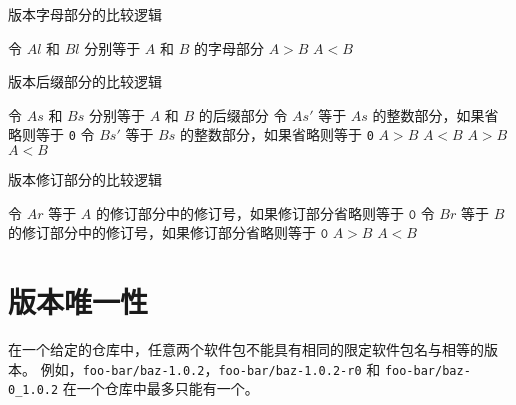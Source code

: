 \begin{algorithm}[p]
\caption{版本字母部分的比较逻辑} \label{alg:version-comparison-letter}
\begin{algorithmic}[1]
    \STATE 令 $Al$ 和 $Bl$ 分别等于 $A$ 和 $B$ 的字母部分
        \RETURN $A>B$
        \RETURN $A<B$
    \ENDIF
\end{algorithmic}
\end{algorithm}

\begin{algorithm}[t]
\caption{版本后缀部分的比较逻辑} \label{alg:version-comparison-suffix}
\begin{algorithmic}[1]
    \STATE 令 $As$ 和 $Bs$ 分别等于 $A$ 和 $B$ 的后缀部分
        \STATE 令 $As'$ 等于 $As$ 的整数部分，如果省略则等于 \texttt{0}
        \STATE 令 $Bs'$ 等于 $Bs$ 的整数部分，如果省略则等于 \texttt{0}
            \RETURN $A>B$
            \RETURN $A<B$
        \ENDIF
        \RETURN $A>B$
    \ELSE
        \RETURN $A<B$
    \ENDIF
\end{algorithmic}
\end{algorithm}

\begin{algorithm}[t]
\caption{版本修订部分的比较逻辑} \label{alg:version-comparison-revision}
\begin{algorithmic}[1]
    \STATE 令 $Ar$ 等于 $A$ 的修订部分中的修订号，如果修订部分省略则等于 $\texttt{0}$
    \STATE 令 $Br$ 等于 $B$ 的修订部分中的修订号，如果修订部分省略则等于 $\texttt{0}$
        \RETURN $A>B$
        \RETURN $A<B$
    \ENDIF
\end{algorithmic}
\end{algorithm}

\section{版本唯一性}

在一个给定的仓库中，任意两个软件包不能具有相同的限定软件包名与相等的版本。
例如，\texttt{foo-bar/baz-1.0.2}，\texttt{foo-bar/baz-1.0.2-r0} 和 \texttt{foo-bar/baz-0_1.0.2}
在一个仓库中最多只能有一个。


